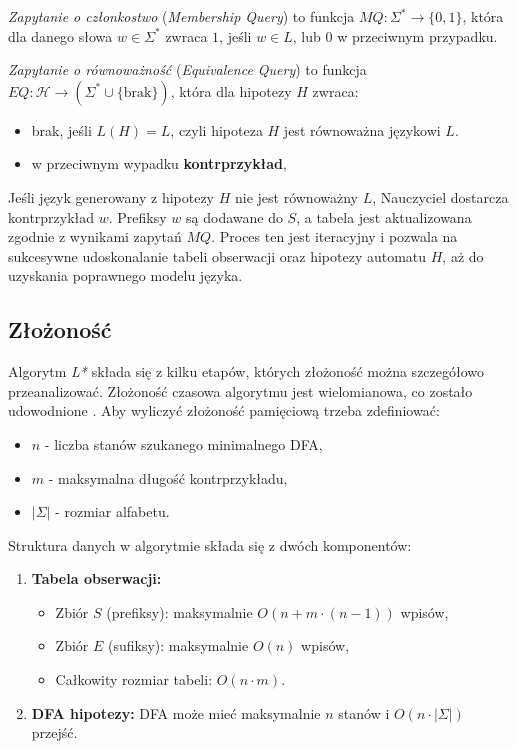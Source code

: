 \begin{definition}
    \emph{Zapytanie o członkostwo} (\emph{Membership Query}) to funkcja \( MQ: \Sigma^* \to \{0, 1\} \), która dla danego słowa \( w \in \Sigma^* \) zwraca \( 1 \), jeśli \( w \in L \), lub \( 0 \) w przeciwnym przypadku.
\end{definition}

\begin{definition}
    \emph{Zapytanie o równoważność} (\emph{Equivalence Query}) to funkcja \( EQ: \mathcal{H} \to (\Sigma^* \cup \{\text{brak}\}) \), która dla hipotezy \( H \) zwraca:
    \begin{itemize}
        \item brak, jeśli \( L(H) = L \), czyli hipoteza \( H \) jest równoważna językowi \( L \).
        \item w przeciwnym wypadku \textbf{kontrprzykład},
    \end{itemize}
\end{definition}


Jeśli język generowany z hipotezy \( H \) nie jest równoważny \( L \), Nauczyciel dostarcza kontrprzykład \( w \). Prefiksy \( w \) są dodawane do \( S \), a tabela jest aktualizowana zgodnie z wynikami zapytań \( MQ \). Proces ten jest iteracyjny i pozwala na sukcesywne udoskonalanie tabeli obserwacji oraz hipotezy automatu \( H \), aż do uzyskania poprawnego modelu języka.

\subsection{Złożoność}

Algorytm \textit{L*} składa się z kilku etapów, których złożoność można szczegółowo przeanalizować. Złożoność czasowa algorytmu jest wielomianowa, co zostało udowodnione \cite{L_STAR}. Aby wyliczyć złożoność pamięciową trzeba zdefiniować:
\begin{itemize}
    \item \(n\) - liczba stanów szukanego minimalnego DFA,
    \item \(m\) - maksymalna długość kontrprzykładu,
    \item \(|\Sigma|\) - rozmiar alfabetu.
\end{itemize}

Struktura danych w algorytmie składa się z dwóch komponentów:
\begin{enumerate}
    \item \textbf{Tabela obserwacji:}
    \begin{itemize}
        \item Zbiór \(S\) (prefiksy): maksymalnie \(O(n + m \cdot (n - 1))\) wpisów,
        \item Zbiór \(E\) (sufiksy): maksymalnie \(O(n)\) wpisów,
        \item Całkowity rozmiar tabeli: \(O(n \cdot m)\).
    \end{itemize}
    \item \textbf{DFA hipotezy:} DFA może mieć maksymalnie \(n\) stanów i \(O(n \cdot |\Sigma|)\) przejść.
\end{enumerate}

